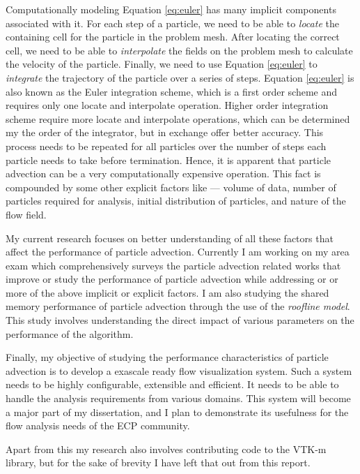 \documentclass[12pt,letter]{article}
\begin{document}
Computationally modeling Equation \ref{eq:euler} has many implicit components  associated with it.
%
For each step of a particle,
we need to be able to \textit{locate} the containing cell for the particle in the problem mesh.
%
After locating the correct cell, we need to be able to \textit{interpolate} the fields on the problem mesh
to calculate the velocity of the particle.
%
Finally, we need to use Equation \ref{eq:euler} to \textit{integrate} the trajectory of the particle
over a series of steps.
%
Equation \ref{eq:euler} is also known as the Euler integration scheme,
which is a first order scheme and requires only one locate and interpolate operation.
%
Higher order integration scheme require more locate and interpolate operations,
which can be determined my the order of the integrator,
but in exchange offer better accuracy.
%
This process needs to be repeated for all particles over the number of steps each
particle needs to take before termination.
%
Hence, it is apparent that particle advection can be a very computationally expensive operation.
%
This fact is compounded by some other explicit factors like --- volume of data,
number of particles required for analysis, initial distribution of particles,
and nature of the flow field.  

My current research focuses on better understanding of all these factors that affect
the performance of particle advection.
%
Currently I am working on my area exam which comprehensively surveys the particle
advection related works that improve or study the  performance of particle advection
while addressing or or more of the above implicit or explicit factors. 
%
I am also studying the shared memory performance of particle advection through
the use of the \textit{roofline model}.
%
This study involves understanding the direct impact of various parameters on the
performance of the algorithm.

Finally, my objective of studying the performance characteristics of particle advection
is to develop a exascale ready flow visualization system.
%
Such a system needs to be highly configurable, extensible and efficient.
%
It needs to be able to handle the analysis requirements from various domains.
%
This system will become a major part of my dissertation, and I plan to demonstrate
its usefulness for the flow analysis needs of the ECP community.

Apart from this my research also involves contributing code to the VTK-m library,
but for the sake of brevity I have left that out from this report.
\end{document}
